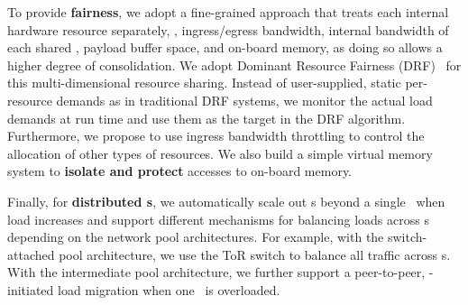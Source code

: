 To provide \textbf{fairness}, we adopt a fine-grained approach that treats each internal hardware resource separately, \eg, ingress/egress bandwidth, internal bandwidth of each shared \nt, payload buffer space, and on-board memory, as doing so allows a higher degree of consolidation.
We adopt Dominant Resource Fairness (DRF)~\cite{DRF} for this multi-dimensional resource sharing.
Instead of user-supplied, static per-resource demands as in traditional DRF systems, we monitor the actual load demands at run time and use them as the target in the DRF algorithm.
Furthermore, we propose to use ingress bandwidth throttling to control the allocation of other types of resources.
We also build a simple virtual memory system to \textbf{isolate and protect} accesses to on-board memory. %

Finally, for \textbf{distributed \snic{}s}, we automatically scale out \nt{}s beyond a single \snic\ when load increases and support different mechanisms for balancing loads across \snic{}s depending on the network pool architectures.
For example, with the switch-attached pool architecture, we use the ToR switch to balance all traffic across \snic{}s.
With the intermediate pool architecture, we further support a peer-to-peer, \snic-initiated load migration when one \snic\ is overloaded.

